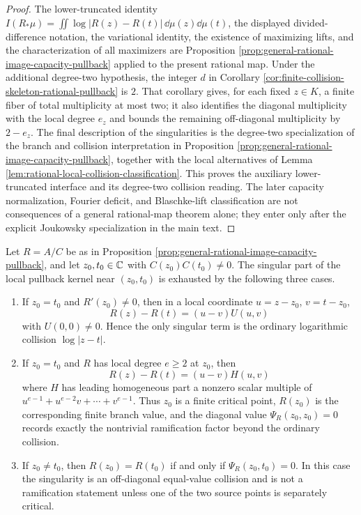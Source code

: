 \begin{proof}
The lower-truncated identity \(I(R_\ast\mu)=\iint\log|R(z)-R(t)|\,\dd\mu(z)\dd\mu(t)\), the displayed divided-difference notation, the variational identity, the existence of maximizing lifts, and the characterization of all maximizers are Proposition \ref{prop:general-rational-image-capacity-pullback} applied to the present rational map.  Under the additional degree-two hypothesis, the integer \(d\) in Corollary \ref{cor:finite-collision-skeleton-rational-pullback} is \(2\).  That corollary gives, for each fixed \(z\in K\), a finite fiber of total multiplicity at most two; it also identifies the diagonal multiplicity with the local degree \(e_z\) and bounds the remaining off-diagonal multiplicity by \(2-e_z\).  The final description of the singularities is the degree-two specialization of the branch and collision interpretation in Proposition \ref{prop:general-rational-image-capacity-pullback}, together with the local alternatives of Lemma \ref{lem:rational-local-collision-classification}.  This proves the auxiliary lower-truncated interface and its degree-two collision reading.  The later capacity normalization, Fourier deficit, and Blaschke-lift classification are not consequences of a general rational-map theorem alone; they enter only after the explicit Joukowsky specialization in the main text.
\end{proof}

\begin{lemma}\label{lem:rational-local-collision-classification}
Let \(R=A/C\) be as in Proposition \ref{prop:general-rational-image-capacity-pullback}, and let \(z_0,t_0\in\mathbb{C}\) with \(C(z_0)C(t_0)\ne0\).  The singular part of the local pullback kernel near \((z_0,t_0)\) is exhausted by the following three cases.
\begin{enumerate}[label=\textup{(\roman*)}]
\item If \(z_0=t_0\) and \(R'(z_0)\ne0\), then in a local coordinate \(u=z-z_0\), \(v=t-z_0\),
\[
R(z)-R(t)=(u-v)U(u,v)
\]
with \(U(0,0)\ne0\).  Hence the only singular term is the ordinary logarithmic collision \(\log|z-t|\).
\item If \(z_0=t_0\) and \(R\) has local degree \(e\ge2\) at \(z_0\), then
\[
R(z)-R(t)=(u-v)H(u,v)
\]
where \(H\) has leading homogeneous part a nonzero scalar multiple of \(u^{e-1}+u^{e-2}v+\cdots+v^{e-1}\).  Thus \(z_0\) is a finite critical point, \(R(z_0)\) is the corresponding finite branch value, and the diagonal value \(\Psi_R(z_0,z_0)=0\) records exactly the nontrivial ramification factor beyond the ordinary collision.
\item If \(z_0\ne t_0\), then \(R(z_0)=R(t_0)\) if and only if \(\Psi_R(z_0,t_0)=0\).  In this case the singularity is an off-diagonal equal-value collision and is not a ramification statement unless one of the two source points is separately critical.
\end{enumerate}
\end{lemma}

